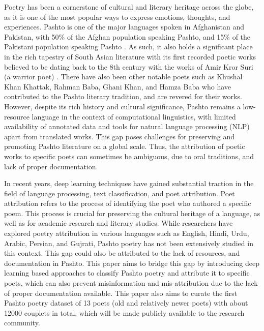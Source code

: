 Poetry has been a cornerstone of cultural and literary heritage across the globe, as it is one of the most popular ways to express emotions, thoughts, and experiences. Pashto is one of the major languages spoken in Afghanistan and Pakistan, with 50\% of the Afghan population speaking Pashto, and 15\% of the Pakistani population speaking Pashto \cite{ciawordlfactbook} \cite{pbs}. As such, it also holds a significant place in the rich tapestry of South Asian literature with its first recorded poetic works believed to be dating back to the 8th century with the works of Amir Kror Suri (a warrior poet) \cite{history_pashto}. There have also been other notable poets such as Khushal Khan Khattak, Rahman Baba, Ghani Khan, and Hamza Baba who have contributed to the Pashto literary tradition, and are revered for their works. However, despite its rich history and cultural significance, Pashto remains a low-resource language in the context of computational linguistics, with limited availability of annotated data and tools for natural language processing (NLP) apart from translated works. This gap poses challenges for preserving and promoting Pashto literature on a global scale. Thus, the attribution of poetic works to specific poets can sometimes be ambiguous, due to oral traditions, and lack of proper documentation. 

In recent years, deep learning techniques have gained substantial traction in the field of language processing, text classification, and poet attribution. Poet attribution refers to the process of identifying the poet who authored a specific poem. This process is crucial for preserving the cultural heritage of a language, as well as for academic research and literary studies. While researchers have explored poetry attribution in various languages such as English, Hindi, Urdu, Arabic, Persian, and Gujrati, Pashto poetry has not been extensively studied in this context. This gap could also be attributed to the lack of resources, and documentation in Pashto. This paper aims to bridge this gap by introducing deep learning based approaches to classify Pashto poetry and attribute it to specific poets, which can also prevent misinformation and mis-attribution due to the lack of proper documentation available. This paper also aims to curate the first Pashto poetry dataset of 13 poets (old and relatively newer poets) with about 12000 couplets in total, which will be made publicly available to the research community.